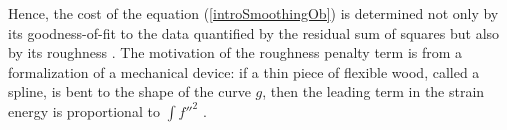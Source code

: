 Hence, the cost of the equation (\ref{introSmoothingOb}) is determined not only by its goodness-of-fit to the data quantified by the residual sum of squares but also by its roughness \cite{schwarz2012geodesy}. The motivation of the roughness penalty term is from a formalization of a mechanical device: if a thin piece of flexible wood, called a spline, is bent to the shape of the curve $g$, then the leading term in the strain energy is proportional to $\int f''^2$ \cite{green1993nonparametric}. 




%
%
%
%
%



